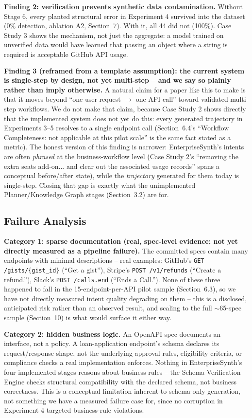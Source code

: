 \documentclass[11pt]{article}
\begin{document}
\textbf{Finding 2: verification prevents synthetic data contamination.} Without Stage 6, every
planted structural error in Experiment 4 survived into the dataset (0\% detection, ablation A2,
Section~7). With it, all 44 did not (100\%). Case Study 3 shows the mechanism, not just the
aggregate: a model trained on unverified data would have learned that passing an object where a
string is required is acceptable GitHub API usage.

\textbf{Finding 3 (reframed from a template assumption): the current system is single-step by
design, not yet multi-step -- and we say so plainly rather than imply otherwise.} A natural claim
for a paper like this to make is that it moves beyond ``one user request $\rightarrow$ one API
call'' toward validated multi-step workflows. We do not make that claim, because Case Study 2 shows
directly that the implemented system does not yet do this: every generated trajectory in
Experiments 3--5 resolves to a single endpoint call (Section~6.4's ``Workflow Completeness: not
applicable at this pilot scale'' is the same fact stated as a metric). The honest version of this
finding is narrower: EnterpriseSynth's intents are often \textit{phrased} at the business-workflow
level (Case Study 2's ``removing the extra seats add-on... and clear out the associated usage
records'' spans a conceptual before/after state), while the \textit{trajectory} generated for them
today is single-step. Closing that gap is exactly what the unimplemented Planner/Knowledge Graph
stages (Section~3.2) are for.

\subsection{Failure Analysis}

\textbf{Category 1: sparse documentation (real, spec-level evidence; not yet directly measured as
a pipeline failure).} The committed specs contain many endpoints with minimal descriptions --
real examples: GitHub's \texttt{GET /gists/\{gist\_id\}} (``Get a gist''), Stripe's
\texttt{POST /v1/refunds} (``Create a refund.''), Slack's \texttt{POST /calls.end} (``Ends a
Call.''). None of these three happened to fall in the 15-endpoint-per-API pilot sample
(Section~6.3), so we have not directly measured intent quality degrading on them -- this is a
disclosed, anticipated risk rather than an observed result, and scaling to the full $\sim$65-spec
sample (Section~10) is what would surface it either way.

\textbf{Category 2: hidden business logic.} An OpenAPI spec documents an interface, not a policy.
A loan-application endpoint's schema declares its request/response shape, not the underlying
approval rules, eligibility criteria, or compliance checks a real implementation enforces. Nothing
in EnterpriseSynth's four implemented stages reasons about business rules -- the Schema
Verification Engine checks structural compatibility with the declared schema, not business
correctness. This is a conceptual limitation inherent to schema-only generation, not something we
have a measured failure case for, since no corruption in Experiment 4 targeted business-rule
violations.
\end{document}
